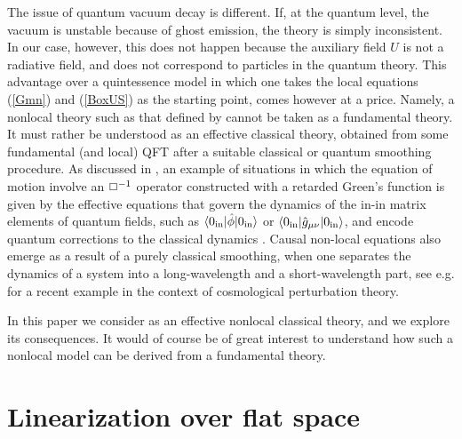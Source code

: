 \documentclass[aps,prd,twocolumn,superscriptaddress,nofootinbib]{revtex4}
\begin{document}
The issue of quantum vacuum decay is different. If, at the quantum level, the vacuum is unstable because of ghost emission, the theory is simply inconsistent. In our case, however, this does not happen because the auxiliary field $U$ is not a radiative field, and does not correspond to particles in the quantum theory.
This advantage over a quintessence model in which one takes the local equations (\ref{Gmn}) and (\ref{BoxUS}) as the starting point, comes however at a price. Namely, a nonlocal theory such as that defined by  cannot be taken as a fundamental theory. It must rather be understood as an effective classical theory, obtained from some fundamental (and local) QFT after a suitable classical or quantum smoothing procedure. As discussed in \cite{Maggiore:2013mea}, an example of situations in which the equation of motion involve an $\Box^{-1}$ operator constructed with a retarded Green's function is given by 
the effective equations that 
govern the  dynamics of the in-in matrix elements of quantum fields, such as 
$\langle 0_{\rm in}|\hat{\phi}|0_{\rm in}\rangle$ or $\langle 0_{\rm in}|\hat{g}_{\mu\nu}|0_{\rm in}\rangle$, and encode  quantum corrections  
to the classical dynamics \cite{Jordan:1986ug,Calzetta:1986ey}.
Causal non-local equations  also emerge as a result of a purely classical smoothing, when one separates the dynamics of a system into a long-wavelength and a short-wavelength part,  see e.g. \cite{Carroll:2013oxa} for a recent example in the context of cosmological perturbation theory. 

In this paper we  consider  as an effective nonlocal classical theory, and we  explore its consequences.
It would  of course be of great interest to understand how such a nonlocal model can be derived from a fundamental theory.

\section{Linearization over flat space}
\end{document}
